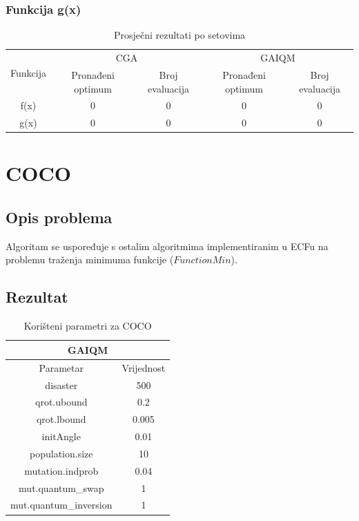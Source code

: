 \documentclass[times, utf8, zavrsni, numeric]{fer}
\begin{document}
\subsubsection{Funkcija g(x)}
\begin{table}[htb]
\caption{Prosječni rezultati po setovima}
\centering
\begin{tabular}{|c|cc|cc|} \hline
\multirow{2}{*}{Funkcija} & \multicolumn{2}{c|}{CGA} & \multicolumn{2}{c|}{GAIQM} \\ \cline{2-5}
 & Pronađeni optimum & Broj evaluacija & Pronađeni optimum & Broj evaluacija \\ 
\hline
f(x) & 0 & 0 & 0 & 0 \\
g(x) & 0 & 0 & 0 & 0 \\
\hline
\end{tabular}
\end{table}

\section{COCO}
\subsection{Opis problema}
Algoritam se uspoređuje s ostalim algoritmima implementiranim u ECFu na problemu traženja minimuma funkcije ($FunctionMin$).

\subsection{Rezultat}
\begin{table}[htb]
\caption{Korišteni parametri za COCO}
\centering
\begin{tabular}{|c|c|} \hline
\multicolumn{2}{|c|}{GAIQM} \\ 
\hline
Parametar & Vrijednost \\ 
\hline
disaster & 500 \\
qrot.ubound & 0.2 \\
qrot.lbound & 0.005 \\
initAngle & 0.01 \\
population.size & 10 \\
mutation.indprob & 0.04 \\
mut.quantum\_swap & 1 \\
mut.quantum\_inversion & 1 \\
\hline
\end{tabular}
\end{table}
\end{document}
